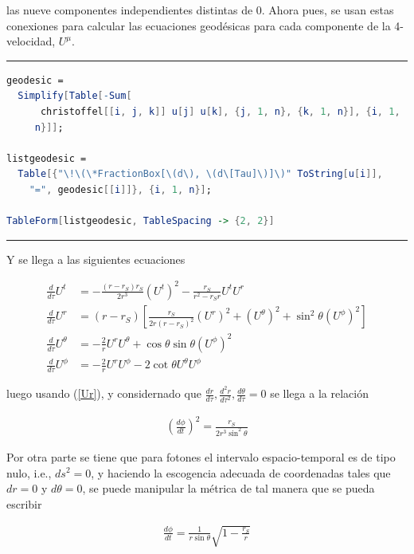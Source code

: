 \documentclass[%
 reprint,
 amsmath,amssymb,
 aps,
floatfix,
]{revtex4-1}
\begin{document}
las nueve componentes independientes distintas de 0. Ahora pues, se usan estas conexiones para calcular las ecuaciones geodésicas para cada componente de la 4-velocidad, $U^\mu$.

\onecolumngrid
\vspace{12pt}
\hrule
\begin{lstlisting}[language=Mathematica]
geodesic = 
  Simplify[Table[-Sum[
      christoffel[[i, j, k]] u[j] u[k], {j, 1, n}, {k, 1, n}], {i, 1, 
     n}]];
     
listgeodesic = 
  Table[{"\!\(\*FractionBox[\(d\), \(d\[Tau]\)]\)" ToString[u[i]], 
    "=", geodesic[[i]]}, {i, 1, n}];

TableForm[listgeodesic, TableSpacing -> {2, 2}]
\end{lstlisting}
\hrule
\vspace{12pt}
\twocolumngrid

Y se llega a las siguientes ecuaciones

\begin{align}
    \tfrac{d}{d\tau}U^t &= - \tfrac{(r-r_S)r_S}{2r^3}(U^t)^2 -\tfrac{r_S}{r^2-r_Sr}U^tU^r \label{Ut}\\
    \tfrac{d}{d\tau}U^r &= {\scriptstyle(r-r_S)}\left[ \tfrac{r_S}{2r(r-r_S)^2}(U^r)^2 + (U^\theta)^2 + \sin^2{\theta}(U^\phi)^2\right] \label{Ur}\\
    \tfrac{d}{d\tau}U^\theta &= -\tfrac{2}{r}U^rU^\theta + \cos{\theta}\sin{\theta}(U^\phi)^2 \label{Uth}\\
    \tfrac{d}{d\tau}U^\phi &= -\tfrac{2}{r}U^rU^\phi -2\cot{\theta}U^\theta U^\phi \label{Uph}
\end{align}

luego usando (\ref{Ur}), y considernado que $\frac{dr}{d\tau},\frac{d^2r}{d\tau^2},\frac{d\theta}{d\tau} = 0$ se llega a la relación

\begin{align}\label{geo}
    \left(\frac{d\phi}{dt}\right)^2 = \frac{r_S}{2r^3\sin^2{\theta}}
\end{align}

Por otra parte se tiene que para fotones el intervalo espacio-temporal es de tipo nulo, i.e., $ds^2 = 0$, y haciendo la escogencia adecuada de coordenadas tales que $dr = 0$ y $d\theta = 0$, se puede manipular la métrica de tal manera que se pueda escribir

\begin{align}\label{met}
    \frac{d\phi}{dt} = \frac{1}{r\sin{\theta}}\sqrt{1-\frac{r_S}{r}}
\end{align}
\end{document}
